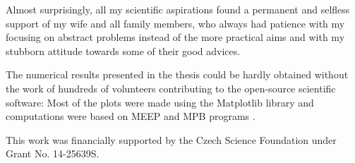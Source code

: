 Almost surprisingly, all my scientific aspirations found a permanent and selfless support of my wife and all family members, who always had patience with my focusing on abstract problems instead of the more practical aims and with my stubborn attitude towards some of their good advices.

The numerical results presented in the thesis could be hardly obtained without the work of hundreds of volunteers contributing to the open-source scientific software: Most of the plots were made using the Matplotlib library \cite{hunter2007} and computations were based on MEEP \cite{oskooi2010meep} and MPB programs \cite{johnson2001mpb}. 

This work was financially supported by the Czech Science Foundation under Grant No. 14-25639S.

\thispagestyle{empty} \newpage
